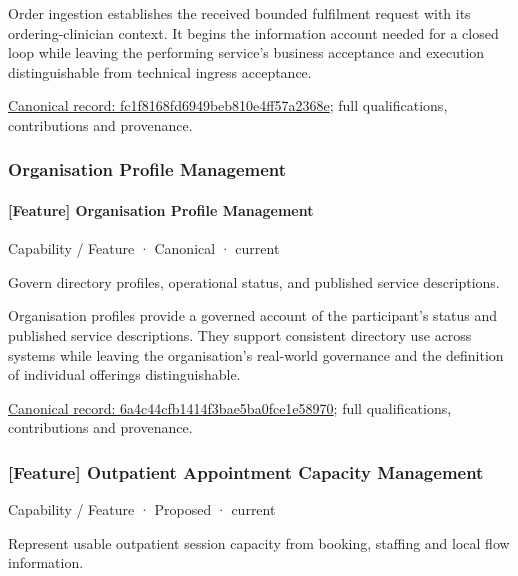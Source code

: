 Order ingestion establishes the received bounded fulfilment request with its ordering-clinician context. It begins the information account needed for a closed loop while leaving the performing service's business acceptance and execution distinguishable from technical ingress acceptance.


{\footnotesize \href{../../../../continuum/strategy/capability/feature/fc1f8168fd6949beb810e4ff57a2368e.md}{Canonical record: fc1f8168fd6949beb810e4ff57a2368e}; full qualifications, contributions and provenance.}\par
\subsubsection{Organisation Profile Management}

\paragraph{[Feature] Organisation Profile Management}

\label{element:6a4c44cfb1414f3bae5ba0fce1e58970}
{\small Capability / Feature · Canonical · current}\par

Govern directory profiles, operational status, and published service descriptions.



Organisation profiles provide a governed account of the participant's status and published service descriptions. They support consistent directory use across systems while leaving the organisation's real-world governance and the definition of individual offerings distinguishable.


{\footnotesize \href{../../../../continuum/strategy/capability/feature/6a4c44cfb1414f3bae5ba0fce1e58970.md}{Canonical record: 6a4c44cfb1414f3bae5ba0fce1e58970}; full qualifications, contributions and provenance.}\par
\subsubsection{[Feature] Outpatient Appointment Capacity Management}

\label{element:3c4f8b0fc23044cbbac32602e1272680}
{\small Capability / Feature · Proposed · current}\par

Represent usable outpatient session capacity from booking, staffing and local flow information.



